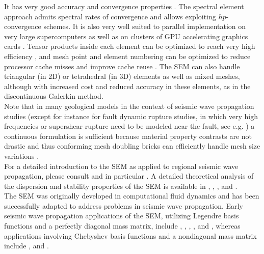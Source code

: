 \documentclass[oneside,english,onecolumn,letterpaper]{book}
\begin{document}
It has very good accuracy and convergence properties \citep{MaPa89,SePr94,DeFiMu02,Coh02,DeSe07,SeOl08,AiWa09,AiWa10,MeStTh12}.
The spectral element approach admits spectral rates of convergence and allows exploiting $hp$-convergence schemes.
It is also very well suited to parallel implementation on very large supercomputers \citep{KoTsChTr03,TsKoChTr03,KoLaMi08a,CaKoLaTiMiLeSnTr08,KoViCh10}
as well as on clusters of GPU accelerating graphics cards \citep{KoMiEr09,KoErGoMi10,Kom11}.
Tensor products inside each element can be optimized to reach very high efficiency \citep{DeFiMu02}, and mesh point and element numbering can be optimized to reduce processor cache misses and improve cache reuse \citep{KoLaMi08a}. The SEM can also handle triangular (in 2D) or tetrahedral (in 3D) elements \citep{WinBoyd96,TaWi00,KoMaTrTaWi01,Coh02,MeViSa06} as well as mixed meshes, although with increased cost and reduced accuracy in these elements, as in the discontinuous Galerkin method.\\

Note that in many geological models in the context of seismic wave propagation studies
(except for instance for fault dynamic rupture studies, in which very high frequencies or supershear rupture need to be modeled near the fault, see e.g. \cite{BeGlCrViPi07,BeGlCrVi09,PuAmKa09,TaCrEtViBeSa10})
a continuous formulation is sufficient because material property contrasts are not drastic and thus
conforming mesh doubling bricks can efficiently handle mesh size variations \citep{KoTr02a,KoLiTrSuStSh04,LeChLiKoHuTr08,LeChKoHuTr09,LeKoHuTr09}.\\

For a detailed introduction to the SEM as applied to regional
seismic wave propagation, please consult \citet{PeKoLuMaLeCaLeMaLiBlNiBaTr11,TrKoLi08,KoVi98,KoTr99,ChKoViCaVaFe07} and
in particular \citet{LeKoHuTr09,LeChKoHuTr09,LeChLiKoHuTr08,GoAmTaCaSmSaMaKo09,WiKoScTr04,KoLiTrSuStSh04}.
A detailed theoretical analysis of the dispersion
and stability properties of the SEM is available in \citet{Coh02}, \citet{DeSe07}, \citet{SeOl07}, \citet{SeOl08} and \citet{MeStTh12}.\\

The SEM was originally developed in computational fluid dynamics \citep{Pat84,MaPa89}
and has been successfully adapted to address problems in seismic wave propagation.
Early seismic wave propagation applications of the SEM, utilizing Legendre basis functions and a
perfectly diagonal mass matrix, include \cite{CoJoTo93}, \cite{Kom97},
\cite{FaMaPaQu97}, \cite{CaGa97}, \cite{KoVi98} and \cite{KoTr99},
whereas applications involving Chebyshev basis functions and a nondiagonal mass matrix
include \cite{SePr94}, \cite{PrCaSe94} and \cite{SePrPr95}.\\
\end{document}
